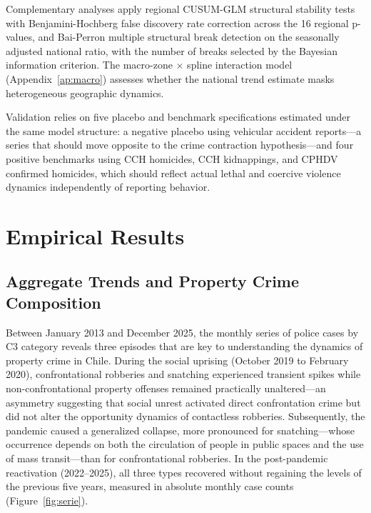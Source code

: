 \documentclass[pdflatex,sn-basic]{sn-jnl}
\begin{document}
Complementary analyses apply regional CUSUM-GLM structural stability tests \citep{zeileis2002} with Benjamini-Hochberg false discovery rate correction across the 16 regional p-values, and Bai-Perron multiple structural break detection \citep{bai1998} on the seasonally adjusted national ratio, with the number of breaks selected by the Bayesian information criterion. The macro-zone $\times$ spline interaction model (Appendix~\ref{ap:macro}) assesses whether the national trend estimate masks heterogeneous geographic dynamics.

Validation relies on five placebo and benchmark specifications estimated under the same model structure: a negative placebo using vehicular accident reports---a series that should move opposite to the crime contraction hypothesis---and four positive benchmarks using CCH homicides, CCH kidnappings, and CPHDV confirmed homicides, which should reflect actual lethal and coercive violence dynamics independently of reporting behavior.
\section{Empirical Results}
\label{sec:resultados}

\subsection{Aggregate Trends and Property Crime Composition}
\label{sub:descriptivo}

Between January 2013 and December 2025, the monthly series of police cases by C3 category reveals three episodes that are key to understanding the dynamics of property crime in Chile. During the social uprising (October 2019 to February 2020), confrontational robberies and snatching experienced transient spikes while non-confrontational property offenses remained practically unaltered---an asymmetry suggesting that social unrest activated direct confrontation crime but did not alter the opportunity dynamics of contactless robberies. Subsequently, the pandemic caused a generalized collapse, more pronounced for snatching---whose occurrence depends on both the circulation of people in public spaces and the use of mass transit---than for confrontational robberies. In the post-pandemic reactivation (2022--2025), all three types recovered without regaining the levels of the previous five years, measured in absolute monthly case counts (Figure~\ref{fig:serie}).
\end{document}
